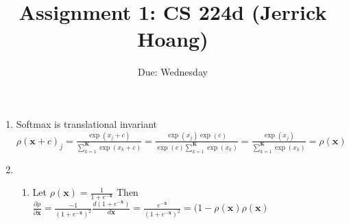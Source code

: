 \documentclass{article}
\title{Assignment 1: CS 224d (Jerrick Hoang)}
\date{Due: Wednesday }
\begin{document}
\maketitle

\begin{enumerate}
\item Softmax is translational invariant
$\rho(\pmb{x} + c)_j = \frac{\exp(x_j + c)}{\sum_{k=1}^{\pmb{K}} \exp(x_k + c)} = \frac{\exp(x_j)\exp(c)}{\exp(c)\sum_{k=1}^{\pmb{K}}\exp(x_k)} = \frac{\exp(x_j)}{\sum_{k=1}^{\pmb{K}}\exp(x_k)} = \rho(\pmb{x})$
\item 
\begin{enumerate}
\item 
Let $\rho(\pmb{x}) = \frac{1}{1 + e^{-\pmb{x}}}$
Then $\frac{\partial \rho}{\partial \pmb{x}} = \frac{-1}{(1+e^{-\pmb{x}})^2} \frac{d (1 + e^{-\pmb{x}})}{d \pmb{x}} = \frac{e^{-\pmb{x}}}{(1 + e^{-\pmb{x}})^2} = (1-\rho(\pmb{x})\rho(\pmb{x})$
\end{enumerate}
\end{enumerate}
\end{document}
